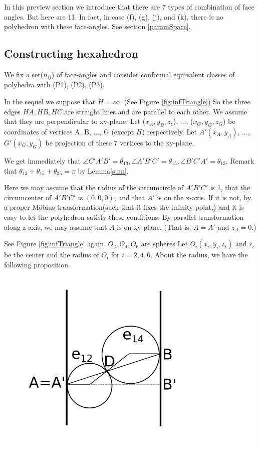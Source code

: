 \documentclass[dvipdfmx]{interact}
\theoremstyle{plain}%
\theoremstyle{definition}
\theoremstyle{remark}
\theoremstyle{problemstyle}
\begin{document}
In this preview section we introduce that there are 7 types of
combination of face angles. But here are 11. In fact, in case (f), (g),
(j), and (k), there is no polyhedron with these face-angles. See section \ref{paramSpace}.

\subsection{Constructing hexahedron}

We fix a set($n_{ij}$) of face-angles and consider conformal equivalent
classes of polyhedra with (P1), (P2), (P3).

In the sequel we suppose that $H = \infty$. (See Figure \ref{fig:infTriangle}) So the three
edges $HA, HB, HC$ are straight lines and are parallel to each other. We
assume that they are perpendicular to xy-plane.
Let ($x_A, y_B, z_z$), ..., ($x_G, y_G, z_G$) be coordinates of vertices
A, B, ..., G (except $H$) respectively. Let $A'(x_A, y_A)$, ...,$G'(x_G,
y_G)$ be projection of these 7 vertices to the xy-plane.

We get immediately that $\angle C'A'B' = \theta_{13}, \angle A'B'C' =
\theta_{15}, \angle B'C'A'=\theta_{13}$. Remark that $\theta_{13} +
\theta_{15} + \theta_{35} = \pi$ by Lemma\ref{sum}.

Here we may assume that the radius of the circumcircle of $A'B'C'$ is 1,
that the circumcenter of $A'B'C'$ is $(0, 0, 0)$, and that $A'$ is on
the x-axis. If it is not, by a proper M\"obius transformation(such that
it fixes the infinity point,) and it is easy to let the polyhedron
satisfy these conditions. By parallel transformation along z-axis, we
may assume that $A$ is on xy-plane. (That is, $A = A'$ and $z_A = 0.$)

See Figure \ref{fig:infTriangle} again. $O_2, O_4, O_6$ are spheres Let $O_i(x_i, y_i, z_i)$
and $r_i$ be the center and the radius of $O_i$ for $i = 2, 4, 6.$ About
the radius, we have the following proposition.

\begin{figure}[h!tbp]
 \centering
 \includegraphics[width=3.5in, height=3.5in,
 keepaspectratio]{./img/HexahedraWithSphericalFaces/sideSlice.png}
 \caption{}
 \label{fig:sideSlice}
\end{figure}
\end{document}
